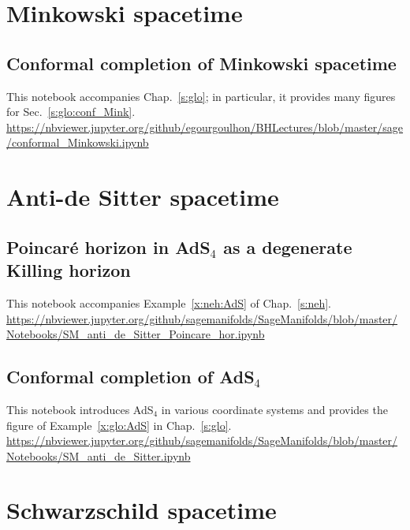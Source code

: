 \section{Minkowski spacetime}

\subsection{Conformal completion of Minkowski spacetime} \label{s:sam:conformal_Mink}

This notebook accompanies Chap.~\ref{s:glo}; in particular, it provides
many figures for Sec.~\ref{s:glo:conf_Mink}.\\[1ex]
{\footnotesize
\url{https://nbviewer.jupyter.org/github/egourgoulhon/BHLectures/blob/master/sage/conformal_Minkowski.ipynb}
}


\section{Anti-de Sitter spacetime}

\subsection{Poincaré horizon in AdS$_4$ as a degenerate Killing horizon} \label{s:sam:Poincare_hor}

This notebook accompanies Example~\ref{x:neh:AdS} of Chap.~\ref{s:neh}.\\[1ex]
{\footnotesize
\url{https://nbviewer.jupyter.org/github/sagemanifolds/SageManifolds/blob/master/Notebooks/SM_anti_de_Sitter_Poincare_hor.ipynb}
}

\subsection{Conformal completion of AdS$_4$}  \label{s:sam:AdS}

This notebook introduces AdS$_4$ in various coordinate systems and provides
the figure of Example~\ref{x:glo:AdS} in Chap.~\ref{s:glo}.\\[1ex]
{\footnotesize
\url{https://nbviewer.jupyter.org/github/sagemanifolds/SageManifolds/blob/master/Notebooks/SM_anti_de_Sitter.ipynb}
}



\section{Schwarzschild spacetime}

